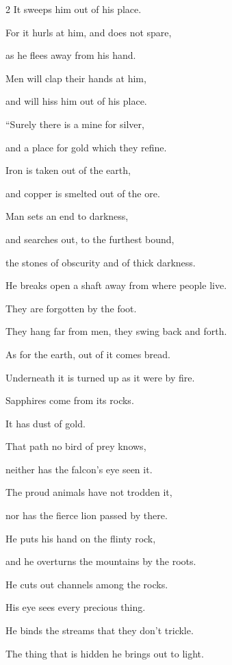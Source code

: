 \begin{multicols}{2}
	It sweeps him out of his place.
	
	\myverse{}For it hurls at him, and does not spare,
	
	as he flees away from his hand.
	
	\myverse{}Men will clap their hands at him,
	
	and will hiss him out of his place.
	
	
	
	
	\mychapter{} \myverse*{}“Surely there is a mine for silver,
	
	\quad\quad and a place for gold which they refine.
	
	\myverse{}Iron is taken out of the earth,
	
	and copper is smelted out of the ore.
	
	\myverse{}Man sets an end to darkness,
	
	and searches out, to the furthest bound,
	
	the stones of obscurity and of thick darkness.
	
	\myverse{}He breaks open a shaft away from where people live.
	
	They are forgotten by the foot.
	
	They hang far from men, they swing back and forth.
	
	\myverse{}As for the earth, out of it comes bread.
	
	Underneath it is turned up as it were by fire.
	
	\myverse{}Sapphires come from its rocks.
	
	It has dust of gold.
	
	\myverse{}That path no bird of prey knows,
	
	neither has the falcon’s eye seen it.
	
	\myverse{}The proud animals have not trodden it,
	
	nor has the fierce lion passed by there.
	
	\myverse{}He puts his hand on the flinty rock,
	
	and he overturns the mountains by the roots.
	
	\myverse{}He cuts out channels among the rocks.
	
	His eye sees every precious thing.
	
	\myverse{}He binds the streams that they don’t trickle.
	
	The thing that is hidden he brings out to light.
	
		\vspace{\baselineskip}
	

\end{multicols}
